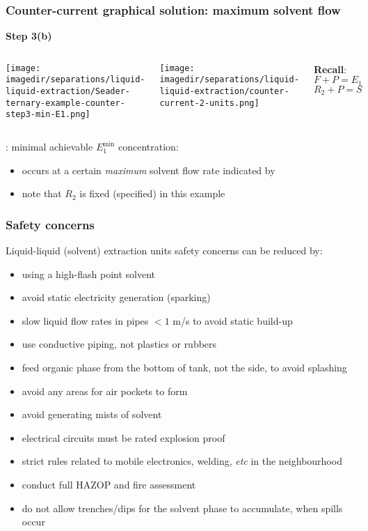 \begin{frame}\frametitle{Counter-current graphical solution: maximum solvent flow}
	\textbf{Step 3(b)}
	\begin{columns}[t]
			\begin{center}
				\texttt{[image: \\imagedir/separations/liquid-liquid-extraction/Seader-ternary-example-counter-step3-min-E1.png]}
			\end{center}
			\begin{center}
				\texttt{[image: \\imagedir/separations/liquid-liquid-extraction/counter-current-2-units.png]}
			\end{center}
			\textbf{Recall}:
			\vspace{-10pt}
			\[	F + P = E_1 \]
			\[	R_2 + P = S \]
	\end{columns}
	{\color{myOrange}{Subtle point}}: minimal achievable $E^\text{min}_1$ concentration:
	{\small
		\begin{itemize}
			\item	occurs at a certain \emph{maximum} solvent flow rate indicated by {\LARGE{\color{myRed}{$\mathbf{\circ}$}}}
			\vspace{-6pt}
			\item	note that $R_2$ is fixed (specified) in this example
		\end{itemize}
	}
\end{frame}

\begin{frame}\frametitle{Safety concerns}
	Liquid-liquid (solvent) extraction units safety concerns can be reduced by:
	\begin{itemize}
		\item	using a high-flash point solvent
		\item	avoid static electricity generation (sparking)
		\item	slow liquid flow rates in pipes $< 1$ m/s to avoid static build-up
		\item	use conductive piping, not plastics or rubbers
		\item	feed organic phase from the bottom of tank, not the side, to avoid splashing
		\item	avoid any areas for air pockets to form
		\item	avoid generating mists of solvent
		\item	electrical circuits must be rated explosion proof
		\item	strict rules related to mobile electronics, welding, \emph{etc} in the neighbourhood
		\item	conduct full HAZOP and fire assessment
		\item	do not allow trenches/dips for the solvent phase to accumulate, when spills occur
	\end{itemize}
\end{frame}


